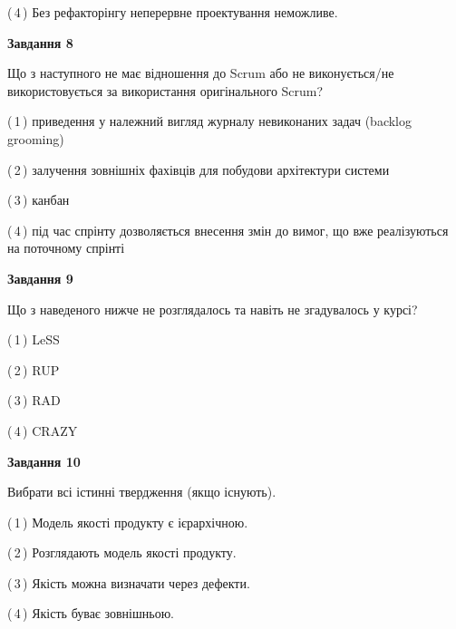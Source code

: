 \documentclass[10pt, ukrainian]{article}
\begin{document}
{\begin {large}
(\,4\,) Без рефакторінгу неперервне проектування неможливе. %


{\begin {center}\textbf{Завдання 8}\end {center}}\par
Що з наступного не має відношення до Scrum або не виконується/не використовується за використання оригінального Scrum?\par
\vspace{2mm}



(\,1\,) приведення у належний вигляд журналу невиконаних задач (backlog grooming) %



(\,2\,) залучення зовнішніх фахівців для побудови архітектури системи%



(\,3\,) канбан%



(\,4\,) під час спрінту дозволяється внесення змін до вимог, що вже реалізуються на поточному спрінті%


{\begin {center}\textbf{Завдання 9}\end {center}}\par
Що з наведеного нижче не розглядалось та навіть не згадувалось у курсі?\par
\vspace{2mm}



(\,1\,) LeSS%



(\,2\,) RUP%



(\,3\,) RAD%



(\,4\,) CRAZY%


{\begin {center}\textbf{Завдання 10}\end {center}}\par
Вибрати всі істинні твердження (якщо існують).\par
\vspace{2mm}



(\,1\,) Модель якості продукту є ієрархічною.%



(\,2\,) Розглядають модель якості продукту.%



(\,3\,) Якість можна визначати через дефекти.%



(\,4\,) Якість буває зовнішньою.%



\end {large}}
\end{document}
